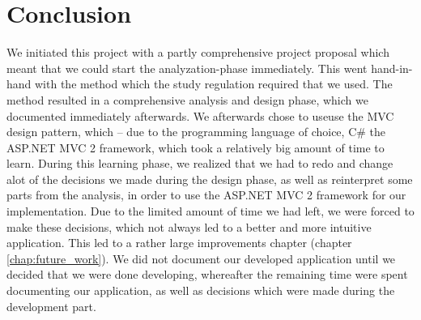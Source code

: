\chapter{Conclusion}
\label{chap:conclusion}
We initiated this project with a partly comprehensive project proposal which meant that we could start the analyzation-phase immediately. This went hand-in-hand with the \ooad{} method which the study regulation required that we used. The \ooad{} method resulted in a comprehensive analysis and design phase, which we documented immediately afterwards. We afterwards chose to useuse the MVC design pattern, which -- due to the programming language of choice, C# the ASP.NET MVC 2 framework, which took a relatively big amount of time to learn. During this learning phase, we realized that we had to redo and change alot of the decisions we made during the design phase, as well as reinterpret some parts from the analysis, in order to use the ASP.NET MVC 2 framework for our implementation. Due to the limited amount of time we had left, we were forced to make these decisions, which not always led to a better and more intuitive application. This led to a rather large improvements chapter (chapter \ref{chap:future_work}). We did not document our developed application until we decided that we were done developing, whereafter the remaining time were spent documenting our application, as well as decisions which were made during the development part.








